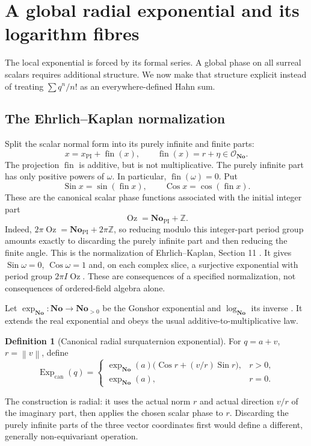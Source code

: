 \documentclass[11pt,letterpaper]{article}
\theoremstyle{definition}
\newtheorem{definition}[theorem]{Definition}
\newcommand{\No}{\mathbf{No}}
\newcommand{\Z}{\mathbb Z}
\newcommand{\OO}{\mathcal O}
\newcommand{\norm}[1]{\left\lVert#1\right\rVert}
\DeclareMathOperator{\fin}{fin}
\DeclareMathOperator{\Sin}{Sin}
\DeclareMathOperator{\Cos}{Cos}
\DeclareMathOperator{\Oz}{Oz}
\newcommand{\ExpC}{\operatorname{Exp}_{\mathrm{can}}}
\begin{document}
\section{A global radial exponential and its logarithm fibres}
\label{sec:global}
The local exponential is forced by its formal series. A global phase on all
surreal scalars requires additional structure. We now make that structure
explicit instead of treating $\sum q^n/n!$ as an everywhere-defined Hahn sum.

\subsection{The Ehrlich--Kaplan normalization}
Split the scalar normal form into its purely infinite and finite parts:
\[
 x=x_{\mathrm{PI}}+\fin(x),\qquad
 \fin(x)=r+\eta\in\OO_{\No}.
\]
The projection $\fin$ is additive, but is not multiplicative. The purely
infinite part has only positive powers of $\omega$. In particular,
$\fin(\omega)=0$. Put
\begin{equation}
 \Sin x=\sin(\fin x),\qquad \Cos x=\cos(\fin x).
 \label{eq:global-phase}
\end{equation}
These are the canonical scalar phase functions associated with the initial
integer part
\[
 \Oz=\No_{\mathrm{PI}}+\Z.
\]
Indeed, $2\pi\Oz=\No_{\mathrm{PI}}+2\pi\Z$, so reducing modulo this integer-part
period group amounts exactly to discarding the purely infinite part and then
reducing the finite angle. This is the normalization of Ehrlich--Kaplan,
Section 11 \cite{ek}. It gives $\Sin\omega=0$, $\Cos\omega=1$ and, on each
complex slice, a surjective exponential with period group $2\pi I\Oz$.
These are consequences of a specified normalization, not consequences of
ordered-field algebra alone.

Let $\exp_{\No}:\No\to\No_{>0}$ be the Gonshor exponential and $\log_{\No}$ its
inverse \cite{gonshor,ek}. It extends the real exponential and obeys the usual
additive-to-multiplicative law.

\begin{definition}[Canonical radial surquaternion exponential]
For $q=a+v$, $r=\norm v$, define
\begin{equation}
 \ExpC(q)=
 \begin{cases}
 \exp_{\No}(a)\bigl(\Cos r+(v/r)\Sin r\bigr),&r>0,\\
 \exp_{\No}(a),&r=0.
 \end{cases}
 \label{eq:global-exp}
\end{equation}
\end{definition}
The construction is radial: it uses the actual norm $r$ and actual direction
$v/r$ of the imaginary part, then applies the chosen scalar phase to $r$.
Discarding the purely infinite parts of the three vector coordinates first
would define a different, generally non-equivariant operation.
\end{document}
